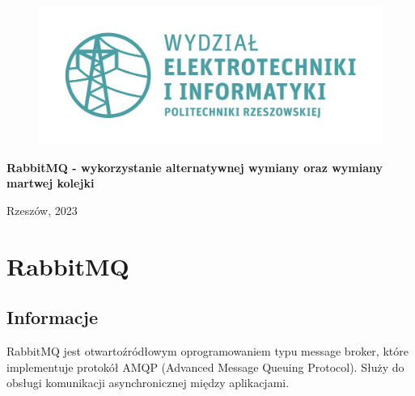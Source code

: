 \documentclass[12pt,twoside]{article}
\begin{document}
\begin{titlepage}
	
	\begin{figure}[!htb]
	\centering
	\includegraphics[width=14cm]{figures/logo.png} 
	\captionsetup{labelformat=empty}
	\caption{}
	\end{figure}
	
	\vspace{2cm}
	
	\centering
	
	\LARGE\textbf{RabbitMQ - wykorzystanie alternatywnej wymiany oraz wymiany martwej kolejki}
	
	\vspace{1cm}
	
	\Large{}
	

	\vspace{6cm}
	\raggedleft
	\normalsize{}
	
	\vspace{0.1cm}

	
	\vspace{0.1cm}
	
	
	\vspace{0.1cm}
	
	
	\vfill
	
	\centering
	Rzeszów, 2023
\end{titlepage}


\tableofcontents
\clearpage





\section{RabbitMQ}
\subsection{Informacje}
RabbitMQ jest otwartoźródłowym oprogramowaniem typu message broker, które implementuje protokół AMQP (Advanced Message Queuing Protocol). Służy do obsługi komunikacji asynchronicznej między aplikacjami.
\end{document}
